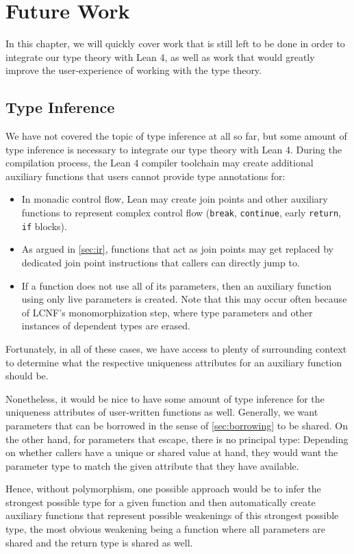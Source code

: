 \chapter{Future Work}\label{sec:futurework}
In this chapter, we will quickly cover work that is still left to be done in order to integrate our type theory with Lean 4, as well as work that would greatly improve the user-experience of working with the type theory.

\section{Type Inference}\label{sec:inference}
We have not covered the topic of type inference at all so far, but some amount of type inference is necessary to integrate our type theory with Lean 4. During the compilation process, the Lean 4 compiler toolchain may create additional auxiliary functions that users cannot provide type annotations for: 
\begin{itemize}
	\item In monadic control flow, Lean may create join points and other auxiliary functions to represent complex control flow (\lstinline|break|, \lstinline|continue|, early \lstinline|return|, \lstinline|if| blocks).
	\item As argued in \cref{sec:ir}, functions that act as join points may get replaced by dedicated join point instructions that callers can directly jump to.
	\item If a function does not use all of its parameters, then an auxiliary function using only live parameters is created. Note that this may occur often because of LCNF's monomorphization step, where type parameters and other instances of dependent types are erased.
\end{itemize}
Fortunately, in all of these cases, we have access to plenty of surrounding context to determine what the respective uniqueness attributes for an auxiliary function should be.

Nonetheless, it would be nice to have some amount of type inference for the uniqueness attributes of user-written functions as well. Generally, we want parameters that can be borrowed in the sense of \cref{sec:borrowing} to be shared. On the other hand, for parameters that escape, there is no principal type: Depending on whether callers have a unique or shared value at hand, they would want the parameter type to match the given attribute that they have available.

Hence, without polymorphism, one possible approach would be to infer the strongest possible type for a given function and then automatically create auxiliary functions that represent possible weakenings of this strongest possible type, the most obvious weakening being a function where all parameters are shared and the return type is shared as well.

